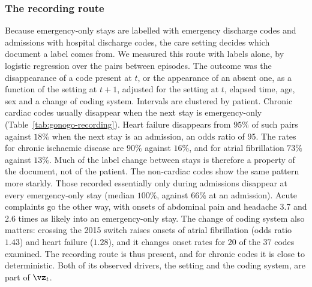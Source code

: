 \subsubsection{The recording route}
\label{sec:gonogo-recording}

Because emergency-only stays are labelled with emergency discharge codes and admissions with hospital discharge codes, the care setting decides which document a label comes from. We measured this route with labels alone, by logistic regression over the pairs between episodes. The outcome was the disappearance of a code present at $t$, or the appearance of an absent one, as a function of the setting at $t+1$, adjusted for the setting at $t$, elapsed time, age, sex and a change of coding system. Intervals are clustered by patient. Chronic cardiac codes usually disappear when the next stay is emergency-only (Table~\ref{tab:gonogo-recording}). Heart failure disappears from $95\%$ of such pairs against $18\%$ when the next stay is an admission, an odds ratio of 95. The rates for chronic ischaemic disease are $90\%$ against $16\%$, and for atrial fibrillation $73\%$ against $13\%$. Much of the label change between stays is therefore a property of the document, not of the patient. The non-cardiac codes show the same pattern more starkly. Those recorded essentially only during admissions disappear at every emergency-only stay (median $100\%$, against $66\%$ at an admission). Acute complaints go the other way, with onsets of abdominal pain and headache 3.7 and 2.6 times as likely into an emergency-only stay. The change of coding system also matters: crossing the 2015 switch raises onsets of atrial fibrillation (odds ratio $1.43$) and heart failure ($1.28$), and it changes onset rates for 20 of the 37 codes examined. The recording route is thus present, and for chronic codes it is close to deterministic. Both of its observed drivers, the setting and the coding system, are part of $\vz_t$.

